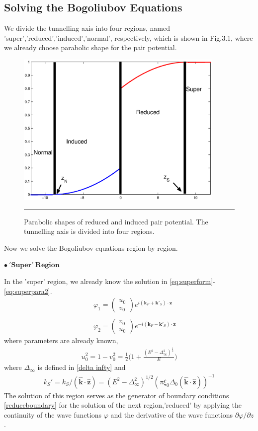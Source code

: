 \subsection{Solving the Bogoliubov Equations}
We divide the tunnelling axis into four regions, named 'super','reduced','induced','normal', respectively, which is shown in Fig.3.1, where we already choose parabolic shape for the pair potential.
\begin{figure}[htbp]
\small
	\centering
		\includegraphics[width=10cm]{./Figures/3-2-1.eps}
		\rule{35em}{0.5pt}
	\caption[An Electron]{Parabolic shapes of reduced and induced pair potential. The tunnelling axis is divided into four regions.}
	\label{fig:EnergyGap}
\end{figure}
Now we solve the Bogoliubov equations region by region.

$\mathbf{\bullet \ 'Super'  \  Region}$

In the 'super' region, we already know the solution in \eqref{eq:superform}-\eqref{eq:superpara2}.
\begin{eqnarray}\label{eq:superform}
&&\varphi_1=
\left(
\begin{array}{c}
 u_0\\
 v_0
 \end{array}\right)e^{i(\mathbf{k}_F+\mathbf{k}'_S)\cdot\mathbf{z}}\nonumber\\
&&\\
&&\varphi_2=
\left(
\begin{array}{c}
 v_0\\
 u_0
 \end{array}\right)e^{-i(\mathbf{k}_F-\mathbf{k}'_S)\cdot\mathbf{z}}\nonumber
\end{eqnarray}
where parameters are already known,
\begin{eqnarray}\label{eq:superpara1}
u_0^2=1-v_0^2=\frac{1}{2}\Big(1+\frac{(E^2-\Delta_{\infty}^2)^{\frac{1}{2}}}{E}\Big)
\end{eqnarray}
where $\Delta_{\infty}$ is defined in \eqref{delta infty} and 
\begin{eqnarray}\label{eq:superpara2}
k_S'=k_S/(\widehat{\mathbf{k}}\cdot\widehat{\mathbf{z}})=(E^2-\Delta_{\infty}^2)^{1/2}(\pi \xi_0 \Delta_0(\widehat{\mathbf{k}}\cdot\widehat{\mathbf{z}}))^{-1}
\end{eqnarray}
The solution of this region serves as the generator of boundary conditions \eqref{reduceboundary} for the solution of the next region,'reduced' by applying the continuity of the wave functions $\varphi$ and the derivative of the wave functions $\partial\varphi/\partial z$. 

